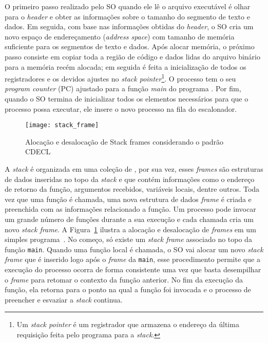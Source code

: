 O primeiro passo realizado pelo SO quando ele lê o arquivo executável é olhar
para o \emph{header} e obter as informações sobre o tamanho do segmento de
texto e dados. Em seguida, com base nas informações obtidas do \emph{header}, o
SO cria um novo espaço de endereçamento (\emph{address space}) com tamanho de
memória suficiente para os segmentos de texto e dados. Após alocar memória, o
próximo passo consiste em copiar toda a região de código e dados lidas do
arquivo binário para a memória recém alocada; em seguida é feita a
inicialização de todos os registradores e os devidos ajustes no \emph{stack
pointer}\footnote{Um \emph{stack pointer} é um registrador que armazena o
endereço da última requisição feita pelo programa para a \emph{stack}.}. O
processo tem o seu \emph{program counter} (PC) ajustado para a função
\emph{main} do programa \citep{patterson}. Por fim, quando o SO termina de
inicializar todos os elementos necessários para que o processo possa executar,
ele insere o novo processo na fila do escalonador.

\begin{figure}[!h]
  \centering
  \texttt{[image: stack\_frame]}
  \caption{Alocação e desalocação de Stack frames considerando o padrão CDECL~\citep{patterson}}
  \label{fig:stack_frames} 
\end{figure}


A \emph{stack} é organizada em uma coleção de , por
sua vez, esses \emph{frames} são estruturas de dados inseridas no topo da
\emph{stack} e que contém informações como o endereço de retorno da função,
argumentos recebidos, variáveis locais, dentre outros. Toda vez que uma função
é chamada, uma nova estrutura de dados \emph{frame} é criada e preenchida com
as informações relacionado a função. Um processo pode invocar um grande número
de funções durante a sua execução e cada chamada cria um novo \emph{stack
frame}. A Figura~\ref{fig:stack_frames} ilustra a alocação e desalocação de
\textit{frames} em um simples programa~\citep{gdb}. No começo, só existe um
\emph{stack frame} associado no topo da função \texttt{main}.  Quando uma
função local é chamada, o SO vai alocar um novo \emph{stack frame} que é
inserido logo após o \emph{frame} da \texttt{main}, esse procedimento permite
que a execução do processo ocorra de forma consistente uma vez que basta
desempilhar o \emph{frame} para retomar o contexto da função anterior. No fim
da execução da função, ela retorna para o ponto na qual a função foi invocada e
o processo de preencher e esvaziar a \emph{stack} continua.

